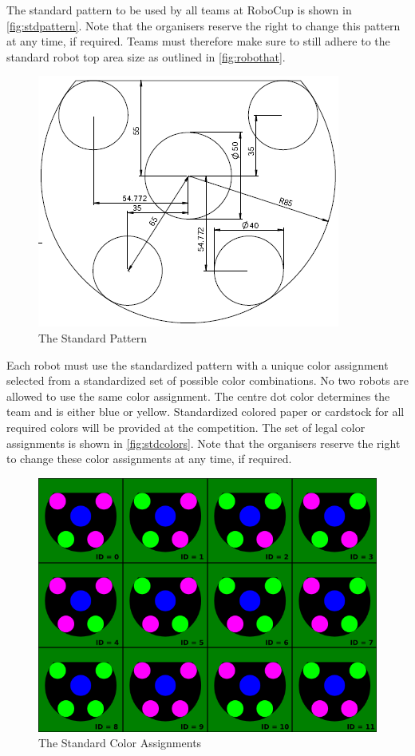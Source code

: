 The standard pattern to be used by all teams at RoboCup  is shown in \autoref{fig:stdpattern}.
Note that the organisers reserve the right to change this pattern at any time, if required.
Teams must therefore make sure to still adhere to the standard robot top area size as outlined in \autoref{fig:robothat}.

\begin{figure}[ht] %
	\centering
	\includegraphics[width=0.8\columnwidth]{img/standard_pattern2010.png}
	\caption{The Standard Pattern}
	\label{fig:stdpattern}
\end{figure}

Each robot must use the standardized pattern with a unique color assignment selected from a standardized set of possible color combinations.
No two robots are allowed to use the same color assignment.
The centre dot color determines the team and is either blue or yellow.
Standardized colored paper or cardstock for all required colors will be provided at the competition.
The set of legal color assignments is shown in \autoref{fig:stdcolors}.
Note that the organisers reserve the right to change these color assignments at any time, if required.

\begin{figure}[ht] %
	\centering
	\includegraphics[width=1.0\columnwidth]{img/standard_colors2010.png}
	\caption{The Standard Color Assignments}
	\label{fig:stdcolors}
\end{figure}

